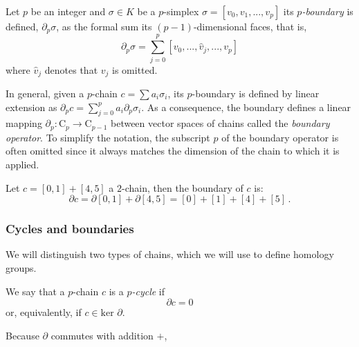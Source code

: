 \documentclass[../main.tex]{subfiles}
\begin{document}
\begin{definition}
Let $p$ be an integer and $\sigma \in K$ be a $p$-simplex $\sigma = [v_0, v_1, ..., v_p]$ its \emph{$p$-boundary} is defined, $\partial_p\sigma$, as the formal sum its $(p-1)$-dimensional faces, that is,
\[
\partial_p\sigma = \sum_{j=0}^{p}[v_0, ..., \hat{v}_j, ..., v_p]
\]
where $\hat{v}_j$ denotes that $v_j$ is omitted.
\end{definition}

In general, given a $p$-chain $c =\sum a_i\sigma_i$, its $p$-boundary is defined by linear extension as $\partial_p c= \sum_{j=0}^{p} a_i \partial_p \sigma_i $. As a consequence, the boundary defines a linear mapping $\partial_p: \text{C}_p \to \text{C}_{p-1}$ between vector spaces of chains called the \emph{boundary operator}. To simplify the notation, the subscript $p$ of the boundary operator is often omitted since it always matches the dimension of the chain to which it is applied.


\begin{exmp}
Let $c = [0,1] + [4,5]$ a $2$-chain, then the boundary of $c$ is:
\[
\partial c = \partial [0,1] + \partial [4,5] = [0] + [1] + [4] + [5]\,.
\]
\end{exmp}

\subsubsection*{Cycles and boundaries}
We will distinguish two types of chains, which we will use to define homology groups.
\begin{definition}
We say that a $p$-chain $c$ is a \emph{$p$-cycle} if
\[
\partial c = 0
\]
or, equivalently, if $c \in \text{ker }\partial$.
\end{definition}

Because $\partial$ commutes with addition $+$, 
\end{document}
